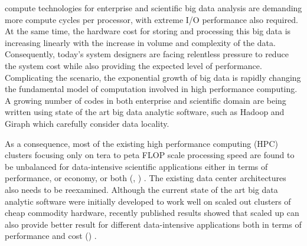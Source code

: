 \documentclass[journal]{IEEEtran}
\begin{document}
 

 compute technologies for enterprise and scientific big data analysis are demanding more compute cycles per processor, with extreme I/O performance also required. At the same time, the hardware cost for storing and processing this big data is increasing linearly with the increase in volume and complexity of the data. Consequently, today's system designers are facing relentless pressure to reduce the system cost while also providing the expected level of performance. Complicating the scenario, the exponential growth of big data is rapidly changing the fundamental model of computation involved in high performance computing. A growing number of codes in both enterprise and scientific domain are being written using state of the art big data analytic software, such as Hadoop and Giraph which carefully consider data locality. 


As a consequence, most of the existing high performance  computing (HPC) clusters focusing only on tera to peta FLOP scale processing speed are found to be unbalanced for data-intensive scientific applications either in terms of performance, or economy, or both (\cite{Amdahl:Workloadchang}, \cite{cluster:AmdahlBalancedBlade}) . The existing data center architectures also needs to be reexamined. Although the current state of the art big data analytic software were initially developed to work well on scaled out clusters of cheap commodity hardware, recently published results showed that scaled up can also provide better result for different data-intensive applications both in terms of performance and cost (\cite{scaleupscaleout:appuswamy}) . 
\end{document}
